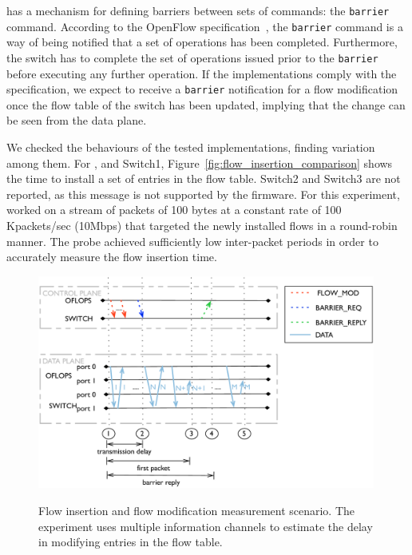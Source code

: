 \of has a mechanism for defining barriers between sets of commands: the
\texttt{barrier} command. According to the OpenFlow
specification~, the \texttt{barrier} command is a way of being
notified that a set of \of operations has been completed. Furthermore, the switch
has to complete the set of operations issued prior to the \texttt{barrier}
before executing any further operation. If the \of implementations comply with
the specification, we expect to receive a \texttt{barrier} notification for a
flow modification once the flow table of the switch has been updated, implying
that the change can be seen from the data plane.

We checked the behaviours of the tested \of implementations, finding variation among
them. For \ovs, and Switch1, Figure~\ref{fig:flow_insertion_comparison} shows the
time to install a set of entries in the flow table. Switch2 and Switch3 are not
reported, as this \of message is not supported by the firmware.  For this
experiment, \oflops worked on a stream of packets of 100 bytes at a constant
rate of 100 Kpackets/sec (10Mbps) that targeted the newly installed flows in a
round-robin manner. The probe achieved sufficiently low inter-packet periods in
order to accurately measure the flow insertion time.

\begin{figure}[h]
  \centering
    \includegraphics[width=0.99\textwidth]{Chapter1/Chapter1Figs/flow_insertion_seq_diagram} 
    \label{fig:flow_mod_scenario}
    \caption[Flow insertion and flow modification measurement scenario] {Flow 
    insertion and flow modification measurement scenario. The experiment uses
    multiple information channels to estimate the delay in modifying entries in
    the flow table.}
\end{figure}

